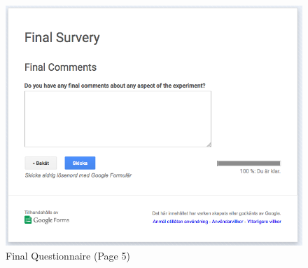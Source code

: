 \begin{figure}[h]
\myfloatalign
\includegraphics[width=\textwidth]{img/final_questionnaire/final_5.png}
\caption{Final Questionnaire (Page 5)}
\end{figure}
